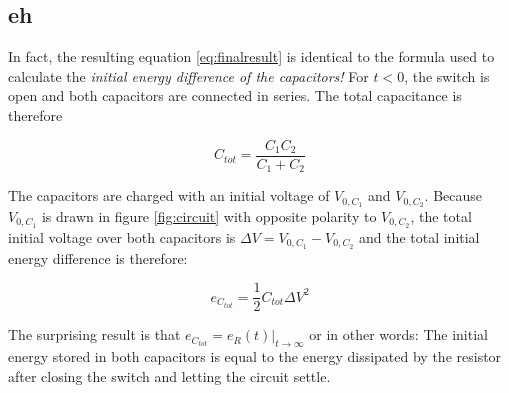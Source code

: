\subsection{eh}

In fact, the resulting equation \ref{eq:finalresult} is identical to the formula used to calculate the \textit{initial energy difference of the capacitors!} For $t<0$, the switch is open and both capacitors are connected in series. The total capacitance is therefore

\begin{equation}
    C_{tot} = \frac{C_1C_2}{C_1+C_2}
\end{equation}

The capacitors are charged with an initial voltage of $V_{0,C_1}$ and $V_{0,C_2}$. Because $V_{0,C_1}$ is drawn in figure \ref{fig:circuit} with opposite polarity to $V_{0,C_2}$, the total initial voltage over both capacitors is $\Delta V = V_{0,C_1} - V_{0,C_2}$ and the total initial energy difference is therefore:

\begin{equation}
    e_{C_{tot}} = \frac{1}{2} C_{tot} {\Delta V}^2
\end{equation}

The surprising result is that $e_{C_{tot}} = e_R(t)\bigg|_{t\to\infty}$ or in other words: The initial energy stored in both capacitors is equal to the energy dissipated by the resistor after closing the switch and letting the circuit settle.
